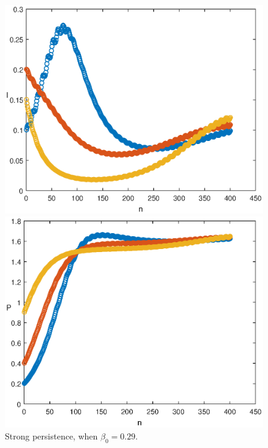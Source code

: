 \documentclass[reqno]{amsart}
\begin{document}
{{\begin{figure}
\begin{minipage}[b]{.32\linewidth}
  \end{minipage}
  \begin{minipage}[b]{.32\linewidth}
        \includegraphics[width=\linewidth]{Infected_PERS_NZT.eps}
  \end{minipage}
  \begin{minipage}[b]{.32\linewidth}
        \includegraphics[width=\linewidth]{Predator_PERS_NZT.eps}
  \end{minipage}
    \caption{Strong persistence, when $\beta_0=0.29$.}
      \label{fig-no-predation-on-uninfected-DF-1}
\end{figure}


}}
\end{document}
